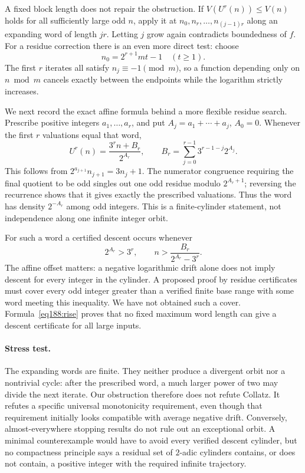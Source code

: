 \documentclass[11pt,a4paper]{article}
\numberwithin{equation}{section}
\begin{document}
A fixed block length does not repair the obstruction. If
$V(U^r(n))\le V(n)$ holds for all sufficiently large odd $n$, apply it at $n_0,n_r,\ldots,n_{(j-1)r}$ along an expanding word of length $jr$. Letting $j$ grow again contradicts boundedness of $f$. For a residue correction there is an even more direct test: choose
\[
 n_0=2^{r+1}mt-1\quad(t\ge1).
\]
The first $r$ iterates all satisfy $n_j\equiv-1\pmod m$, so a function depending only on $n\bmod m$ cancels exactly between the endpoints while the logarithm strictly increases.

We next record the exact affine formula behind a more flexible residue search. Prescribe positive integers $a_1,\ldots,a_r$, and put $A_j=a_1+\cdots+a_j$, $A_0=0$. Whenever the first $r$ valuations equal that word,
\begin{equation}\label{eq188:word}
 U^r(n)=\frac{3^rn+B_r}{2^{A_r}},\qquad
 B_r=\sum_{j=0}^{r-1}3^{r-1-j}2^{A_j}.
\end{equation}
This follows from $2^{a_{j+1}}n_{j+1}=3n_j+1$. The numerator congruence requiring the final quotient to be odd singles out one odd residue modulo $2^{A_r+1}$; reversing the recurrence shows that it gives exactly the prescribed valuations. Thus the word has density $2^{-A_r}$ among odd integers. This is a finite-cylinder statement, not independence along one infinite integer orbit.

For such a word a certified descent occurs whenever
\[
 2^{A_r}>3^r,\qquad
 n>\frac{B_r}{2^{A_r}-3^r}.
\]
The affine offset matters: a negative logarithmic drift alone does not imply descent for every integer in the cylinder. A proposed proof by residue certificates must cover every odd integer greater than a verified finite base range with some word meeting this inequality. We have not obtained such a cover. Formula~\eqref{eq188:rise} proves that no fixed maximum word length can give a descent certificate for all large inputs.

\paragraph{Stress test.}
The expanding words are finite. They neither produce a divergent orbit nor a nontrivial cycle: after the prescribed word, a much larger power of two may divide the next iterate. Our obstruction therefore does not refute Collatz. It refutes a specific universal monotonicity requirement, even though that requirement initially looks compatible with average negative drift. Conversely, almost-everywhere stopping results do not rule out an exceptional orbit. A minimal counterexample would have to avoid every verified descent cylinder, but no compactness principle says a residual set of $2$-adic cylinders contains, or does not contain, a positive integer with the required infinite trajectory.
\end{document}
